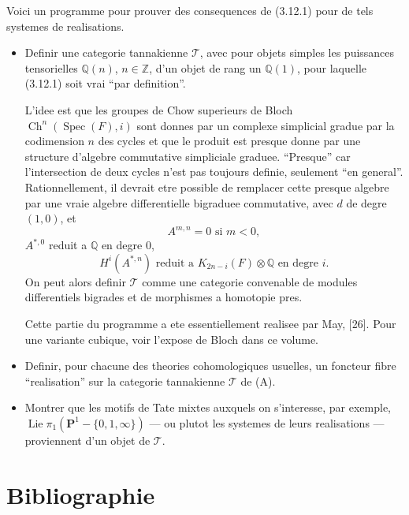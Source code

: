 \documentclass[11pt,a4paper]{article}
\theoremstyle{plain}
\theoremstyle{definition}
\DeclareMathOperator{\Spec}{Spec}
\DeclareMathOperator{\Ch}{Ch}
\DeclareMathOperator{\Lie}{Lie}
\newcommand{\Q}{\mathbb{Q}}
\newcommand{\Z}{\mathbb{Z}}
\begin{document}
Voici un programme pour prouver des consequences de (3.12.1) pour de tels systemes de realisations.

\begin{itemize}
\item[(A)] Definir une categorie tannakienne $\mathcal{T}$, avec pour objets simples les puissances tensorielles $\Q(n)$, $n \in \Z$, d'un objet de rang un $\Q(1)$, pour laquelle (3.12.1) soit vrai ``par definition''.

L'idee est que les groupes de Chow superieurs de Bloch $\Ch^n(\Spec(F), i)$ sont donnes par un complexe simplicial gradue par la codimension $n$ des cycles et que le produit est presque donne par une structure d'algebre commutative simpliciale graduee. ``Presque'' car l'intersection de deux cycles n'est pas toujours definie, seulement ``en general''. Rationnellement, il devrait etre possible de remplacer cette presque algebre par une vraie algebre differentielle bigraduee commutative, avec $d$ de degre $(1, 0)$, et
$$
A^{m,n} = 0 \text{ si } m < 0,
$$
$A^{*,0}$ reduit a $\Q$ en degre $0$,
$$
H^i(A^{*,n}) \text{ reduit a } K_{2n-i}(F) \otimes \Q \text{ en degre } i.
$$
On peut alors definir $\mathcal{T}$ comme une categorie convenable de modules differentiels bigrades et de morphismes a homotopie pres.

Cette partie du programme a ete essentiellement realisee par May, [26]. Pour une variante cubique, voir l'expose de Bloch dans ce volume.

\item[(B)] Definir, pour chacune des theories cohomologiques usuelles, un foncteur fibre ``realisation'' sur la categorie tannakienne $\mathcal{T}$ de (A).

\item[(C)] Montrer que les motifs de Tate mixtes auxquels on s'interesse, par exemple, $\Lie \pi_1(\mathbf{P}^1 - \{0, 1, \infty\})$ --- ou plutot les systemes de leurs realisations --- proviennent d'un objet de $\mathcal{T}$.
\end{itemize}


\section*{Bibliographie}
\end{document}
